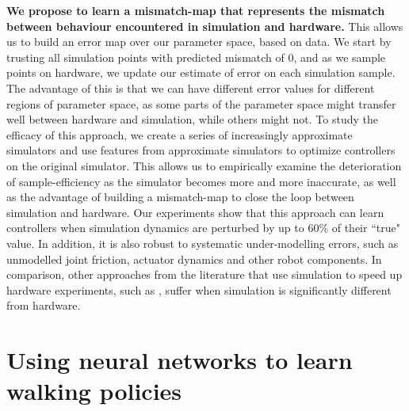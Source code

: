  \textbf{We propose to learn a mismatch-map that represents the mismatch between behaviour encountered in simulation and hardware.} This allows us to build an error map over our parameter space, based on data. We start by trusting all simulation points with predicted mismatch of 0, and as we sample points on hardware, we update our estimate of error on each simulation sample. The advantage of this is that we can have different error values for different regions of parameter space, as some parts of the parameter space might transfer well between hardware and simulation, while others might not. %
To study the efficacy of this approach, we create a series of increasingly approximate simulators and use features from approximate simulators to optimize controllers on the original simulator. This allows us to empirically examine the deterioration of sample-efficiency as the simulator becomes more and more inaccurate, as well as the advantage of building a mismatch-map to close the loop between simulation and hardware. Our experiments show that this approach can learn controllers when simulation dynamics are perturbed by up to 60\% of their ``true" value. In addition, it is also robust to systematic under-modelling errors, such as unmodelled joint friction, actuator dynamics and other robot components. In comparison, other approaches from the literature that use simulation to speed up hardware experiments, such as \cite{cully2015robots}, suffer when simulation is significantly different from hardware. 


\section{Using neural networks to learn walking policies}

